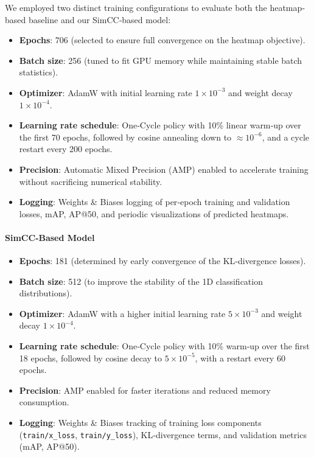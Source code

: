We employed two distinct training configurations to evaluate both the heatmap‐based baseline and our SimCC‐based model:

\begin{itemize}
  \item \textbf{Epochs}: 706 (selected to ensure full convergence on the heatmap objective).
  \item \textbf{Batch size}: 256 (tuned to fit GPU memory while maintaining stable batch statistics).
  \item \textbf{Optimizer}: AdamW with initial learning rate \(1\times10^{-3}\) and weight decay \(1\times10^{-4}\).
  \item \textbf{Learning rate schedule}: One‐Cycle policy with 10\% linear warm‐up over the first 70 epochs, followed by cosine annealing down to \(\approx10^{-6}\), and a cycle restart every 200 epochs.
  \item \textbf{Precision}: Automatic Mixed Precision (AMP) enabled to accelerate training without sacrificing numerical stability.
  \item \textbf{Logging}: Weights \& Biases logging of per‐epoch training and validation losses, mAP, AP@50, and periodic visualizations of predicted heatmaps.
\end{itemize}

\paragraph{SimCC‐Based Model}
\begin{itemize}
  \item \textbf{Epochs}: 181 (determined by early convergence of the KL‐divergence losses).
  \item \textbf{Batch size}: 512 (to improve the stability of the 1D classification distributions).
  \item \textbf{Optimizer}: AdamW with a higher initial learning rate \(5\times10^{-3}\) and weight decay \(1\times10^{-4}\).
  \item \textbf{Learning rate schedule}: One‐Cycle policy with 10\% warm‐up over the first 18 epochs, followed by cosine decay to \(5\times10^{-5}\), with a restart every 60 epochs.
  \item \textbf{Precision}: AMP enabled for faster iterations and reduced memory consumption.
  \item \textbf{Logging}: Weights \& Biases tracking of training loss components (\texttt{train/x\_loss}, \texttt{train/y\_loss}), KL‐divergence terms, and validation metrics (mAP, AP@50).
\end{itemize}